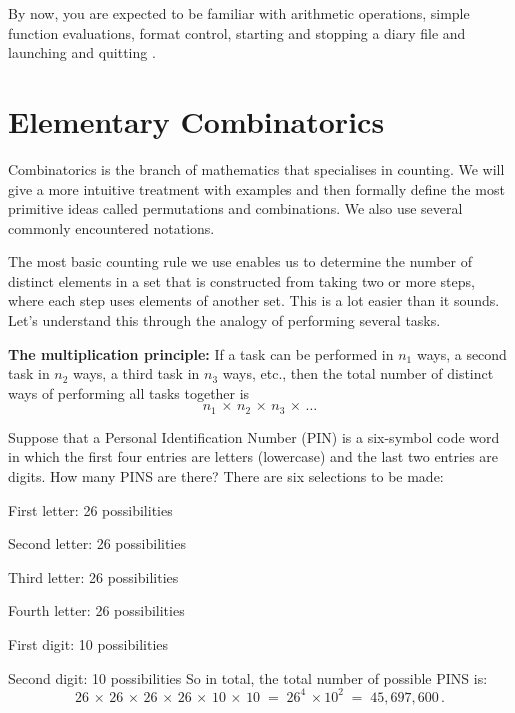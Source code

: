 By now, you are expected to be familiar with arithmetic operations, simple function evaluations, format control, starting and stopping a diary file and launching and quitting \Matlab.

\section{Elementary Combinatorics}\label{S:PermsFactsCombs}

Combinatorics is the branch of mathematics that specialises in counting.
We will give a more intuitive treatment with examples and then formally define the most primitive ideas called permutations and combinations. We also use several commonly encountered notations.

The most basic counting rule we use enables us to determine the number of distinct elements in a set that is constructed from taking two or more steps, where each step uses elements of another set.
This is a lot easier than it sounds. Let's understand this through the analogy of performing several tasks.

\begin{framed}{\bf The multiplication principle:}
If a task can be performed in $n_1$ ways, a second task in $n_2$ ways, a
third task in $n_3$ ways, etc., then the total number of distinct ways
of performing all tasks together is
\[n_1\,\times\,n_2\,\times\,n_3\,\times\, \dots  \]
\end{framed}

\begin{example}\label{EX:unrestrictedPIN}
Suppose that a Personal Identification Number (PIN) is a six-symbol code word in which the first four entries are letters (lowercase) and the last two entries are digits.
How many PINS are there? There are six selections to be made:
\bit
\item[] First letter: 26 possibilities
\item[] Second letter: 26 possibilities
\item[] Third letter: 26 possibilities
\item[] Fourth letter: 26 possibilities
\item[] First digit: 10 possibilities
\item[] Second digit: 10 possibilities
\eit\ecols
So in total, the total number of possible PINS is:
\[ 26\,\times\,26 \,\times\,26\,\times\,26\,\times\,10\,\times\,10\;=\;
26^4\,\times 10^2 \;=\;45,697,600\,.\]
\end{example}

